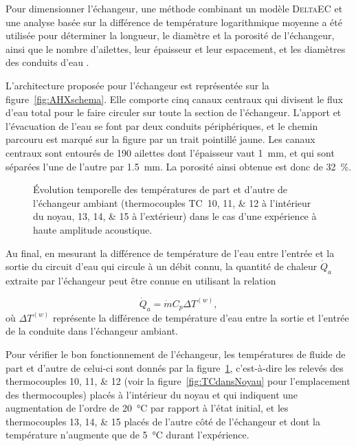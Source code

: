 Pour dimensionner l'échangeur, une méthode combinant un modèle \textsc{DeltaEC} et une analyse basée sur la différence de température logarithmique moyenne a été utilisée pour déterminer la longueur, le diamètre et la porosité de l'échangeur, ainsi que le nombre d'ailettes, leur épaisseur et leur espacement, et les diamètres des conduits d'eau \cite{ramadan_design_2021}. \smallskip

L'architecture proposée pour l'échangeur est représentée sur la figure~\ref{fig:AHXschema}. Elle comporte cinq canaux centraux qui divisent le flux d'eau total pour le faire circuler sur toute la section de l'échangeur. L'apport et l'évacuation de l'eau se font par deux conduits périphériques, et le chemin parcouru est marqué sur la figure par un trait pointillé jaune. Les canaux centraux sont entourés de \num{190} ailettes dont l'épaisseur vaut \qty{1}{\milli\meter}, et qui sont séparées l'une de l'autre par \qty{1.5}{\milli\metre}. La porosité ainsi obtenue est donc de \qty{32}{\percent}. 

\begin{figure}[!ht]
	\centering
	
	\caption{\'Evolution temporelle des températures de part et d'autre de l'échangeur ambiant (thermocouples TC~\numlist{10;11;12} à l'intérieur du noyau, \numlist{13;14;15} à l'extérieur) dans le cas d'une expérience à haute amplitude acoustique.}
	\label{fig:TemperatureAHX_InOut}
\end{figure}

Au final, en mesurant la différence de température de l'eau entre l'entrée et la sortie du circuit d'eau qui circule à un débit connu, la quantité de chaleur $\dot Q_a$ extraite par l'échangeur peut être connue en utilisant la relation 

\begin{equation}
	\dot Q_a = \dot m C_p \Delta T^{(w)},
	\label{eq:Qa_Definition}
\end{equation}
où $\Delta T^{(w)}$ représente la différence de température d'eau entre la sortie et l'entrée de la conduite dans l'échangeur ambiant.\bigskip

Pour vérifier le bon fonctionnement de l'échangeur, les températures de fluide de part et d'autre de celui-ci sont donnés par la figure~\ref{fig:TemperatureAHX_InOut}, c'est-à-dire les relevés des thermocouples \numlist{10;11;12} (voir la figure~\ref{fig:TCdansNoyau} pour l'emplacement des thermocouples) placés à l'intérieur du noyau et qui indiquent une augmentation de l'ordre de \qty{20}{\degreeCelsius} par rapport à l'état initial, et les thermocouples \numlist{13;14;15} placés de l'autre côté de l'échangeur et dont la température n'augmente que de \qty{5}{\degreeCelsius} durant l'expérience.

